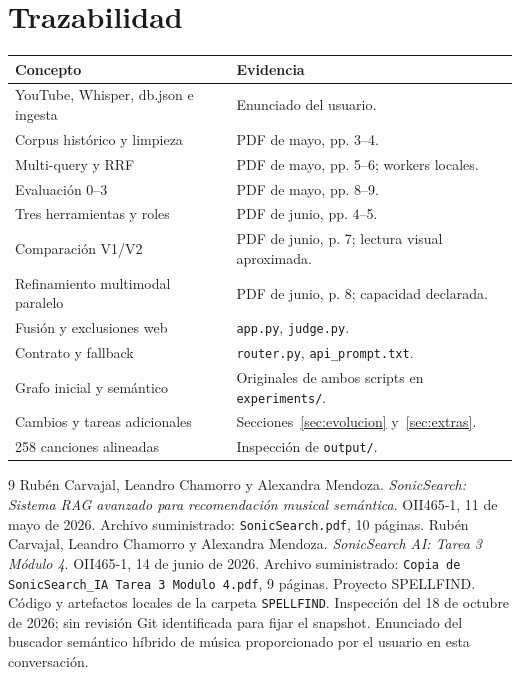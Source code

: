 \documentclass[11pt,a4paper]{article}
\newcommand{\code}[1]{\nolinkurl{#1}}
\begin{document}
\section{Trazabilidad}
\small
\begin{longtable}{p{}p{}}
\toprule Concepto & Evidencia\\\midrule\endhead
YouTube, Whisper, db.json e ingesta & Enunciado del usuario.\\
Corpus histórico y limpieza & PDF de mayo, pp. 3--4.\\
Multi-query y RRF & PDF de mayo, pp. 5--6; workers locales.\\
Evaluación 0--3 & PDF de mayo, pp. 8--9.\\
Tres herramientas y roles & PDF de junio, pp. 4--5.\\
Comparación V1/V2 & PDF de junio, p. 7; lectura visual aproximada.\\
Refinamiento multimodal paralelo & PDF de junio, p. 8; capacidad declarada.\\
Fusión y exclusiones web & \code{app.py}, \code{judge.py}.\\
Contrato y fallback & \code{router.py}, \code{api_prompt.txt}.\\
Grafo inicial y semántico & Originales de ambos scripts en \code{experiments/}.\\
Cambios y tareas adicionales & Secciones~\ref{sec:evolucion} y~\ref{sec:extras}.\\
258 canciones alineadas & Inspección de \code{output/}.\\
\bottomrule
\end{longtable}
\normalsize
\begin{thebibliography}{9}
 Rubén Carvajal, Leandro Chamorro y Alexandra Mendoza.
\emph{SonicSearch: Sistema RAG avanzado para recomendación musical semántica}.
OII465-1, 11 de mayo de 2026. Archivo suministrado: \code{SonicSearch.pdf}, 10 páginas.
 Rubén Carvajal, Leandro Chamorro y Alexandra Mendoza.
\emph{SonicSearch AI: Tarea 3 Módulo 4}. OII465-1, 14 de junio de 2026.
Archivo suministrado: \code{Copia de SonicSearch_IA Tarea 3 Modulo 4.pdf}, 9 páginas.
 Proyecto SPELLFIND. Código y artefactos locales de la carpeta \code{SPELLFIND}.
Inspección del 18 de octubre de 2026; sin revisión Git identificada para fijar el snapshot.
 Enunciado del buscador semántico híbrido de música proporcionado por el usuario en esta conversación.
\end{thebibliography}
\end{document}
